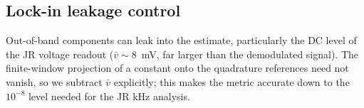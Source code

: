 \subsection{Lock-in leakage control}\label{supp:lockin}
Out-of-band components can leak into the estimate, particularly the DC level of the JR voltage readout ($\bar v\!\sim\!8$~mV, far
larger than the demodulated signal). The finite-window projection of a constant onto the quadrature references
need not vanish, so we subtract $\bar v$ explicitly; this makes the metric
accurate down to the $10^{-8}$ level needed for the JR kHz
analysis.
